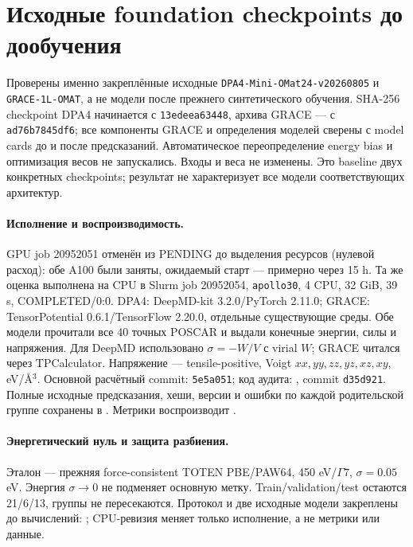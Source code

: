 \documentclass[11pt,a4paper]{article}
\begin{document}
\section{Исходные foundation checkpoints до дообучения}
\label{sec:fm-baseline}
Проверены именно закреплённые исходные
\texttt{DPA4-Mini-OMat24-v20260805} и \texttt{GRACE-1L-OMAT},
а не модели после прежнего синтетического обучения.
SHA-256 checkpoint DPA4 начинается с \texttt{13edeea63448}, архива GRACE
--- с \texttt{ad76b7845df6}; все компоненты GRACE и определения моделей
сверены с model cards до и после предсказаний.
Автоматическое переопределение energy bias и оптимизация весов не запускались.
Входы и веса не изменены. Это baseline двух конкретных checkpoints;
результат не характеризует все модели соответствующих архитектур.

\paragraph{Исполнение и воспроизводимость.}
GPU job 20952051 отменён из PENDING до выделения ресурсов (нулевой расход):
обе A100 были заняты, ожидаемый старт --- примерно через 15 h.
Та же оценка выполнена на CPU в Slurm job 20952054,
\texttt{apollo30}, 4 CPU, 32 GiB, 39 s, COMPLETED/0:0.
DPA4: DeepMD-kit 3.2.0/PyTorch 2.11.0; GRACE:
TensorPotential 0.6.1/TensorFlow 2.20.0, отдельные существующие среды.
Обе модели прочитали все 40 точных POSCAR и выдали конечные энергии,
силы и напряжения. Для DeepMD использовано $\sigma=-W/V$ с virial $W$;
GRACE читался через TPCalculator. Напряжение --- tensile-positive,
Voigt $xx,yy,zz,yz,xz,xy$, eV/\AA$^3$.
Основной расчётный commit: \texttt{5e5a051}; код аудита:
, commit \texttt{d35d921}.
Полные исходные предсказания, хеши, версии и ошибки по каждой родительской
группе сохранены в
.
Метрики воспроизводит .

\paragraph{Энергетический нуль и защита разбиения.}
Эталон --- прежняя force-consistent TOTEN PBE/PAW64,
450 eV/$\Gamma7$, $\sigma=0.05$ eV. Энергия $\sigma\to0$ не подменяет
основную метку. Train/validation/test остаются 21/6/13, группы не
пересекаются. Протокол и две исходные модели закреплены до вычислений:
;
CPU-ревизия меняет только исполнение, а не метрики или данные.
\end{document}
